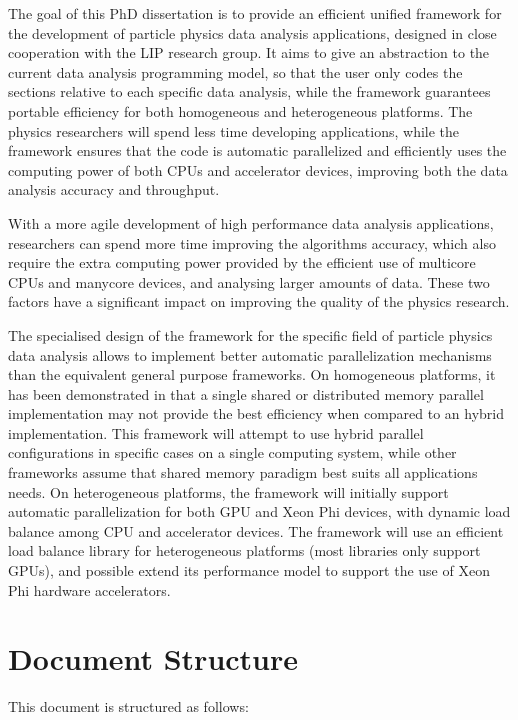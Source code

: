 The goal of this PhD dissertation is to provide an efficient unified framework for the development of particle physics data analysis applications, designed in close cooperation with the LIP research group. It aims to give an abstraction to the current data analysis programming model, so that the user only codes the sections relative to each specific data analysis, while the framework guarantees portable efficiency for both homogeneous and heterogeneous platforms. The physics researchers will spend less time developing applications, while the framework ensures that the code is automatic parallelized and efficiently uses the computing power of both CPUs and accelerator devices, improving both the data analysis accuracy and throughput.

With a more agile development of high performance data analysis applications, researchers can spend more time improving the algorithms accuracy, which also require the extra computing power provided by the efficient use of multicore CPUs and manycore devices, and analysing larger amounts of data. These two factors have a significant impact on improving the quality of the physics research.

The specialised design of the framework for the specific field of particle physics data analysis allows to implement better automatic parallelization mechanisms than the equivalent general purpose frameworks. On homogeneous platforms, it has been demonstrated in \cite{paperAMP,Msc:AMP} that a single shared or distributed memory parallel implementation may not provide the best efficiency when compared to an hybrid implementation. This framework will attempt to use hybrid parallel configurations in specific cases on a single computing system, while other frameworks assume that shared memory paradigm best suits all applications needs. On heterogeneous platforms, the framework will initially support automatic parallelization for both \nvidia GPU and \intel Xeon Phi devices, with dynamic load balance among CPU and accelerator devices. The framework will use an efficient load balance library for heterogeneous platforms (most libraries only support GPUs), and possible extend its performance model to support the use of \intel Xeon Phi hardware accelerators.

\section{Document Structure}
\label{structure}

This document is structured as follows:

